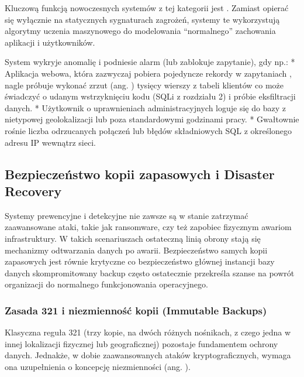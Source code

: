 \documentclass[a4paper,11pt,english,openany,oneside]{sphinxmanual}
\begin{document}
\sphinxAtStartPar
Kluczową funkcją nowoczesnych systemów z tej kategorii jest . Zamiast opierać się wyłącznie na statycznych sygnaturach zagrożeń, systemy te wykorzystują algorytmy uczenia maszynowego do modelowania “normalnego” zachowania aplikacji i użytkowników.

\sphinxAtStartPar
System wykryje anomalię i podniesie alarm (lub zablokuje zapytanie), gdy np.:
* Aplikacja webowa, która zazwyczaj pobiera pojedyncze rekordy w zapytaniach , nagle próbuje wykonać zrzut (ang. ) tysięcy wierszy z tabeli klientów \textendash{} co może świadczyć o udanym wstrzyknięciu kodu (SQLi z rozdziału 2) i próbie eksfiltracji danych.
* Użytkownik o uprawnieniach administracyjnych loguje się do bazy z nietypowej geolokalizacji lub poza standardowymi godzinami pracy.
* Gwałtownie rośnie liczba odrzucanych połączeń lub błędów składniowych SQL z określonego adresu IP wewnątrz sieci.

\sphinxstepscope


\subsection{Bezpieczeństwo kopii zapasowych i Disaster Recovery}
\label{\detokenize{rozdzial_2/rozdzial_27/rozdzial_6:bezpieczenstwo-kopii-zapasowych-i-disaster-recovery}}\label{\detokenize{rozdzial_2/rozdzial_27/rozdzial_6::doc}}
\sphinxAtStartPar
Systemy prewencyjne i detekcyjne nie zawsze są w stanie zatrzymać zaawansowane ataki, takie jak ransomware, czy też zapobiec fizycznym awariom infrastruktury. W takich scenariuszach ostateczną linią obrony stają się mechanizmy odtwarzania danych po awarii. Bezpieczeństwo samych kopii zapasowych jest równie krytyczne co bezpieczeństwo głównej instancji bazy danych \textendash{} skompromitowany backup często ostatecznie przekreśla szanse na powrót organizacji do normalnego funkcjonowania operacyjnego.


\subsubsection{Zasada 3\sphinxhyphen{}2\sphinxhyphen{}1 i niezmienność kopii (Immutable Backups)}
\label{\detokenize{rozdzial_2/rozdzial_27/rozdzial_6:zasada-3-2-1-i-niezmiennosc-kopii-immutable-backups}}
\sphinxAtStartPar
Klasyczna reguła 3\sphinxhyphen{}2\sphinxhyphen{}1 (trzy kopie, na dwóch różnych nośnikach, z czego jedna w innej lokalizacji fizycznej lub geograficznej) pozostaje fundamentem ochrony danych. Jednakże, w dobie zaawansowanych ataków kryptograficznych, wymaga ona uzupełnienia o koncepcję niezmienności (ang. ).
\end{document}
